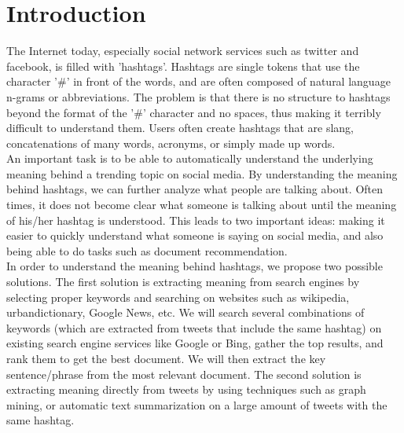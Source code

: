 \documentclass{sig-alternate}
\begin{document}

\section{Introduction}
The Internet today, especially social network services such as twitter and facebook, is filled with 'hashtags'. Hashtags are single tokens that use the character '\#' in front of the words, and are often composed of natural language n-grams or abbreviations. The problem is that there is no structure to hashtags beyond the format of the '\#' character and no spaces, thus making it terribly difficult to understand them. Users often create hashtags that are slang, concatenations of many words, acronyms, or simply made up words.\\
An important task is to be able to automatically understand the underlying meaning behind a trending topic on social media. By understanding the meaning behind hashtags, we can further analyze what people are talking about. Often times, it does not become clear what someone is talking about until the meaning of his/her hashtag is understood. This leads to two important ideas: making it easier to quickly understand what someone is saying on social media, and also being able to do tasks such as document recommendation.\\
In order to understand the meaning behind hashtags, we propose two possible solutions. The first solution is extracting meaning from search engines by selecting proper keywords and searching on websites such as wikipedia, urbandictionary, Google News, etc. We will search several combinations of keywords (which are extracted from tweets that include the same hashtag) on existing search engine services like Google or Bing, gather the top results, and rank them to get the best document. We will then extract the key sentence/phrase from the most relevant document. The second solution is extracting meaning directly from tweets by using techniques such as graph mining, or automatic text summarization on a large amount of tweets with the same hashtag.\\
\end{document}
